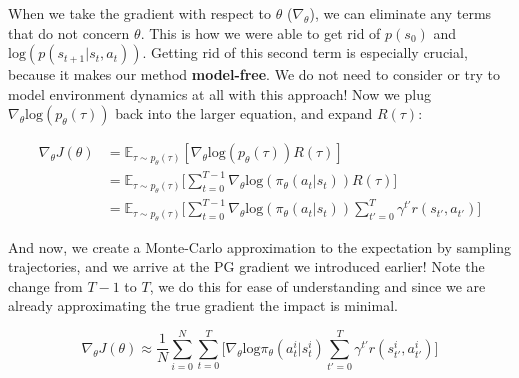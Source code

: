 \begin{flushleft}
    When we take the gradient with respect to $\theta$ ($\nabla_\theta$), we can eliminate any terms that do not concern $\theta$. This is how we were able to get rid of $p(s_0)$ and $\mathrm{log}(p(s_{t+1}|s_t,a_t))$. Getting rid of this second term is especially crucial, because it makes our method \textbf{model-free}. We do not need to consider or try to model environment dynamics at all with this approach! Now we plug $\nabla_\theta \mathrm{log}(p_\theta(\tau))$ back into the larger equation, and expand $R(\tau)$:

    \begin{align*}
        \nabla_\theta J(\theta) &= \mathbb{E}_{\tau \sim p_\theta(\tau)}[\nabla_\theta \mathrm{log}(p_\theta(\tau)) R(\tau)] \\
        &= \mathbb{E}_{\tau \sim p_\theta(\tau)}\biggl[\sum_{t=0}^{T-1} \nabla_\theta\mathrm{log}(\pi_\theta(a_t|s_t))R(\tau)\biggr]\\
        &= \mathbb{E}_{\tau \sim p_\theta(\tau)}\biggl[\sum_{t=0}^{T-1} \nabla_\theta\mathrm{log}(\pi_\theta(a_t|s_t))\sum_{t'=0}^T \gamma^{t'} r(s_{t'}, a_{t'})\biggr]
    \end{align*}

    And now, we create a Monte-Carlo approximation to the expectation by sampling trajectories, and we arrive at the PG gradient we introduced earlier! Note the change from $T-1$ to $T$, we do this for ease of understanding and since we are already approximating the true gradient the impact is minimal.

    $$\nabla_\theta J(\theta) \approx \frac{1}{N}\sum_{i=0}^N\sum_{t=0}^T\biggl[ \nabla_\theta \mathrm{log}\pi_\theta(a_t^i|s_t^i)\sum_{t'=0}^T \gamma^{t'} r(s_{t'}^i, a_{t'}^i)\biggr]$$
\end{flushleft}

